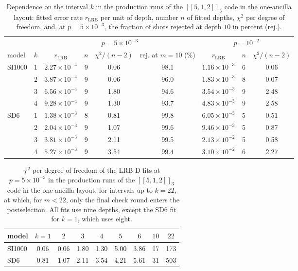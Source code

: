 \begin{table}[tp]
  \centering
  \small
  \begin{tabular}{lc|cccc|ccc}
    \hline
    & & \multicolumn{4}{c|}{$p = 5\times10^{-3}$} & \multicolumn{3}{c}{$p = 10^{-2}$} \\
    model & $k$ & $r_{\mathrm{LRB}}$ & $n$ & $\chi^2/(n-2)$ & rej. at $m = 10$ (\%) & $r_{\mathrm{LRB}}$ & $n$ & $\chi^2/(n-2)$ \\
    \hline
    SI1000 & 1 & $2.27\times10^{-4}$ & 9 & 0.06 & 98.1 & $1.16\times10^{-3}$ & 6 & 0.06 \\
     & 2 & $3.87\times10^{-4}$ & 9 & 0.06 & 96.0 & $1.83\times10^{-3}$ & 8 & 0.07 \\
     & 3 & $6.56\times10^{-4}$ & 9 & 1.80 & 94.6 & $3.54\times10^{-3}$ & 9 & 2.48 \\
     & 4 & $9.28\times10^{-4}$ & 9 & 1.30 & 93.7 & $4.83\times10^{-3}$ & 9 & 2.58 \\
    \hline
    SD6 & 1 & $1.38\times10^{-3}$ & 8 & 0.81 & 99.8 & $6.05\times10^{-3}$ & 5 & 0.51 \\
     & 2 & $2.04\times10^{-3}$ & 9 & 1.07 & 99.6 & $9.46\times10^{-3}$ & 5 & 0.87 \\
     & 3 & $3.81\times10^{-3}$ & 9 & 2.11 & 99.5 & $2.13\times10^{-2}$ & 5 & 0.58 \\
     & 4 & $5.27\times10^{-3}$ & 9 & 3.54 & 99.4 & $3.10\times10^{-2}$ & 6 & 2.27 \\
    \hline
  \end{tabular}
  \caption{Dependence on the interval $k$ in the production runs of the $[[5,1,2]]_3$ code in the one-ancilla layout: fitted error rate $r_{\mathrm{LRB}}$ per unit of depth, number $n$ of fitted depths, $\chi^2$ per degree of freedom, and, at $p = 5\times10^{-3}$, the fraction of shots rejected at depth $10$ in percent (rej.).}
  \label{tab:kdep}
\end{table}

\begin{table}[tp]
  \centering
  \small
  \begin{tabular}{l|cccccccc}
    \hline
    model & $k = 1$ & $2$ & $3$ & $4$ & $5$ & $6$ & $10$ & $22$ \\
    \hline
    SI1000 & 0.06 & 0.06 & 1.80 & 1.30 & 5.00 & 3.86 & 17 & 173 \\
    SD6 & 0.81 & 1.07 & 2.11 & 3.54 & 4.21 & 5.61 & 31 & 503 \\
    \hline
  \end{tabular}
  \caption{$\chi^2$ per degree of freedom of the LRB-D fits at $p = 5\times10^{-3}$ in the production runs of the $[[5,1,2]]_3$ code in the one-ancilla layout, for intervals up to $k = 22$, at which, for $m < 22$, only the final check round enters the postselection. All fits use nine depths, except the SD6 fit for $k = 1$, which uses eight.}
  \label{tab:chi_largek}
\end{table}

